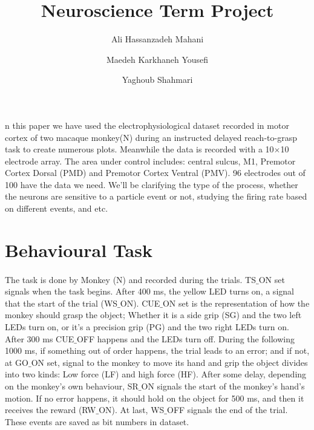 \documentclass[9pt,twocolumn]{paper-template}
\title{Neuroscience Term Project}
\author[a,b]{Ali Hassanzadeh Mahani}
\author[b,c]{Maedeh Karkhaneh Yousefi}
\author[a]{Yaghoub Shahmari}
\affil[a]{Student, Physics Department, Sharif University of Technology}
\affil[b]{Affiliation Two}
\affil[c]{Affiliation Three}
\begin{document}
\maketitle
\thispagestyle{firststyle}

n this paper we have used the electrophysiological dataset recorded in motor cortex of two macaque monkey(N) during an instructed delayed reach-to-grasp task to create numerous plots. Meanwhile the data is recorded with a 10$ \times $10 electrode array. The area under control includes: central sulcus, M1, Premotor Cortex Dorsal (PMD) and Premotor Cortex Ventral (PMV). 96 electrodes out of 100 have the data we need.
We'll be clarifying the type of the process, whether the neurons are sensitive to a particle event or not, studying the firing rate based on different events, and etc. \citep{dataset}
\section*{Behavioural Task}
\paragraph*{}
The task is done by Monkey (N) and recorded during the trials. TS$ \_ $ON set signals when the task begins. After 400 ms, the yellow LED turns on, a signal that the start of the trial (WS$ \_ $ON). CUE$ \_ $ON set is the representation of how the monkey should grasp the object; Whether it is a side grip (SG) and the two left LEDs turn on, or it's a precision grip (PG) and the two right LEDs turn on. After 300 ms CUE$ \_ $OFF happens and the LEDs turn off. During the following 1000 ms, if something out of order happens, the trial leads to an error; and if not, at GO$ \_ $ON set, signal to the monkey to move its hand and grip the object divides into two kinds: Low force (LF) and high force (HF). After some delay, depending on the monkey's own behaviour, SR$ \_ $ON signals the start of the monkey's hand's motion. If no error happens, it should hold on the object for 500 ms, and then it receives the reward (RW$ \_ $ON). At last, WS$ \_ $OFF signals the end of the trial. These events are saved as bit numbers in dataset. 
\end{document}
